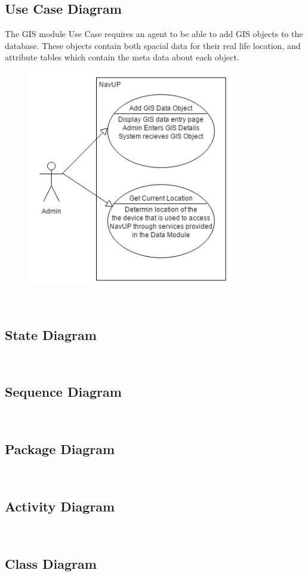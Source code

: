 \subsection{Use Case Diagram}

The GIS module Use Case requires an agent to be able to add GIS objects to the database. These objects contain both spacial data for their real life location, and attribute tables which contain the meta data about each object. \\

\begin{figure} 
  \includegraphics[width=0.8\textwidth]{GIS/GIS_Use_case.png}
\end{figure}
\\

\subsection{State Diagram}

\\

\subsection{Sequence Diagram}

\\

\subsection{Package Diagram}

\\

\subsection{Activity Diagram}

\\

\subsection{Class Diagram}

\\
